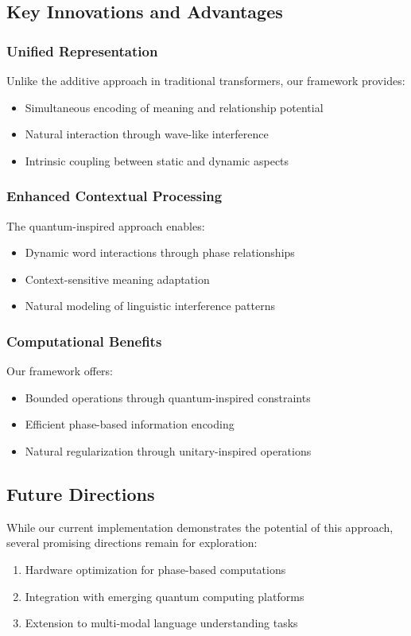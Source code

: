 \documentclass[twocolumn]{article}
\begin{document}
\subsection{Key Innovations and Advantages}

\subsubsection{Unified Representation}
Unlike the additive approach in traditional transformers, our framework provides:
\begin{itemize}
    \item Simultaneous encoding of meaning and relationship potential
    \item Natural interaction through wave-like interference
    \item Intrinsic coupling between static and dynamic aspects
\end{itemize}

\subsubsection{Enhanced Contextual Processing}
The quantum-inspired approach enables:
\begin{itemize}
    \item Dynamic word interactions through phase relationships
    \item Context-sensitive meaning adaptation
    \item Natural modeling of linguistic interference patterns
\end{itemize}

\subsubsection{Computational Benefits}
Our framework offers:
\begin{itemize}
    \item Bounded operations through quantum-inspired constraints
    \item Efficient phase-based information encoding
    \item Natural regularization through unitary-inspired operations
\end{itemize}

\subsection{Future Directions}
While our current implementation demonstrates the potential of this approach, several promising directions remain for exploration:
\begin{enumerate}
    \item Hardware optimization for phase-based computations
    \item Integration with emerging quantum computing platforms
    \item Extension to multi-modal language understanding tasks
\end{enumerate}
\end{document}
